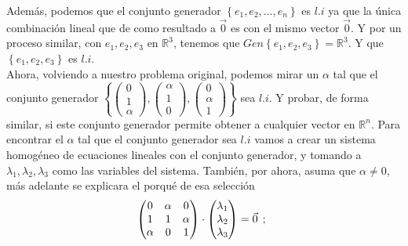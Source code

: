 \documentclass{article}
\begin{document}
\begin{enumerate}
        Además, podemos que el conjunto generador \(\left\{e_1, e_2, \ldots, e_n\right\}\) es \(l.i\) 
        ya que la única combinación lineal que de como resultado a \(\vec{0}\) es con el mismo vector \(\vec{0}\).
        Y por un proceso similar, con \(e_1, e_2, e_3\) en \(\mathbb{R}^3\), tenemos que \(Gen\left\{e_1, e_2, e_3\right\} = \mathbb{R}^3\). Y que \(\left\{e_1, e_2, e_3\right\}\) es \(l.i\).
        \\
        Ahora, volviendo a nuestro problema original, podemos mirar un \(\alpha\) tal que el conjunto generador 
        \(
        \left\{
            \begin{pmatrix}
                0 \\ 1 \\ \alpha
            \end{pmatrix},
            \begin{pmatrix}
                \alpha \\ 1 \\ 0
            \end{pmatrix},
            \begin{pmatrix}
                0 \\ \alpha \\ 1
            \end{pmatrix}
        \right\}
        \)
        sea \(l.i\). Y probar, de forma similar, si este conjunto generador permite obtener a cualquier vector en \(\mathbb{R}^n\).
        Para encontrar el \(\alpha\) tal que el conjunto generador sea \(l.i\) vamos a crear un sistema homogéneo de ecuaciones lineales con el conjunto generador, 
        y tomando a \(\lambda_1, \lambda_2, \lambda_3\) como las variables del sistema. 
        También, por ahora, asuma que \(\alpha \neq 0\), más adelante se explicara el porqué de esa selección
        \[
            \begin{pmatrix}
                0 & \alpha & 0 \\
                1 & 1 & \alpha \\
                \alpha & 0 & 1
            \end{pmatrix}
            \cdot
            \begin{pmatrix}
                \lambda_1 \\ \lambda_2 \\ \lambda_3
            \end{pmatrix}
            =
            \vec{0}
            \hspace{1ex};\hspace{1ex}
\]
\end{enumerate}
\end{document}

